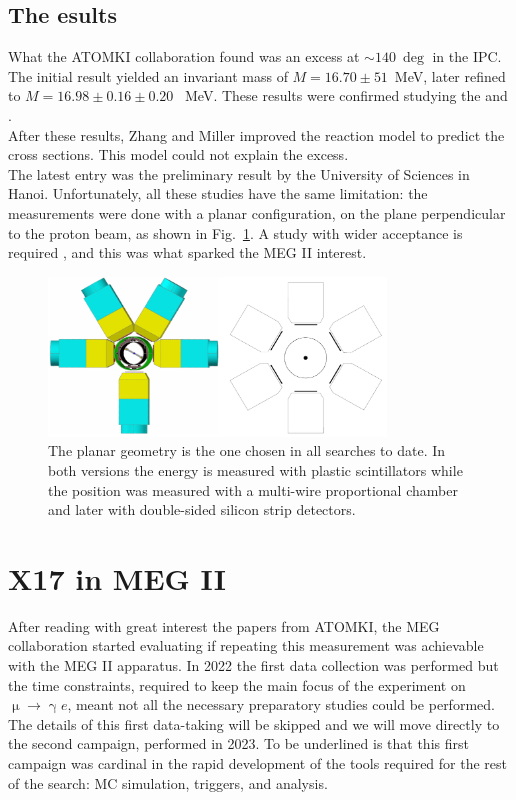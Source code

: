 \begin{refsection}
    \subsection{The esults}
        What the ATOMKI collaboration found was an excess at $\sim\SI{140}{\deg}$ in the IPC. 
        The initial result yielded an invariant mass of $M = 16.70\pm51$~MeV, later refined to $M=16.98\pm0.16\pm0.20$~ MeV.
        These results were confirmed studying the  and .\\
        After these results, Zhang and Miller \cite{X17:Zhang:2017}\cite{X17:Zhang:2020}\cite{X17:Zahng:2021} improved the reaction model to predict the cross sections. This model could not explain the excess.\\
        The latest entry was the preliminary result by the  University of Sciences in Hanoi.
        Unfortunately, all these studies have the same limitation: the measurements were done with a planar configuration,  on the plane perpendicular to the proton beam, as shown in Fig.~\ref{fig:X17:ATOMKI}.
        A study with wider acceptance is required \cite{}, and this was what sparked the MEG II interest.

        \begin{figure}
            \centering
            \includegraphics[width = 0.8\textwidth]{Figures/X17/Atomki_geometry.png}
            \caption{The planar geometry is the one chosen in all searches to date. In both versions the energy is measured with plastic scintillators while the position was measured with a multi-wire proportional chamber and later with double-sided silicon strip detectors.}
            \label{fig:X17:ATOMKI}
        \end{figure}
        
\section{X17 in MEG II}
    After reading with great interest the papers from ATOMKI, the MEG collaboration started evaluating if repeating this measurement was achievable with the MEG II apparatus.
    In 2022 the first data collection was performed but the time constraints, required to keep the main focus of the experiment on $\upmu \rightarrow \upgamma e$, meant not all the necessary preparatory studies could be performed.
    The details of this first data-taking will be skipped and we will move directly to the second campaign, performed in 2023. 
    To be underlined is that this first campaign was cardinal in the rapid development of the tools required for the rest of the search: MC simulation, triggers, and analysis.
        

\end{refsection}
